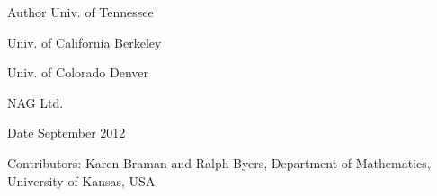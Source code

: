 \begin{DoxyAuthor}{Author}
Univ. of Tennessee 

Univ. of California Berkeley 

Univ. of Colorado Denver 

N\+A\+G Ltd. 
\end{DoxyAuthor}
\begin{DoxyDate}{Date}
September 2012 
\end{DoxyDate}
\begin{DoxyParagraph}{Contributors\+: }
Karen Braman and Ralph Byers, Department of Mathematics, University of Kansas, U\+S\+A 
\end{DoxyParagraph}
